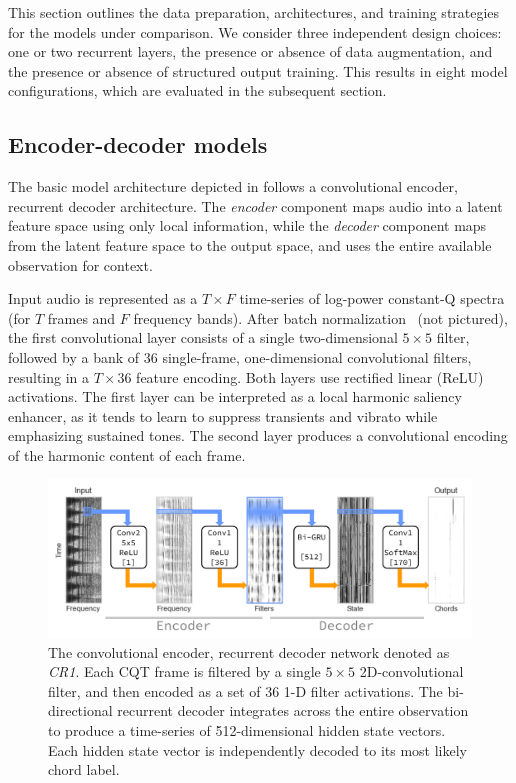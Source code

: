 \documentclass{article}
\begin{document}

This section outlines the data preparation, architectures, and training strategies for the models under comparison.
We consider three independent design choices: one or two recurrent layers, the presence or absence of data augmentation, and the presence or absence of structured output training.
This results in eight model configurations, which are evaluated in the subsequent section.

\subsection{Encoder-decoder models}

The basic model architecture depicted in  follows a convolutional encoder, recurrent decoder architecture.
The \emph{encoder} component maps audio into a latent feature space using only local information, while the \emph{decoder} component maps from the latent feature space to the output space, and uses the entire available observation for context.

Input audio is represented as a $T\times F$ time-series of log-power constant-Q spectra (for $T$ frames and $F$ frequency bands).
After batch normalization~\cite{ioffe2015batch} (not pictured), the first convolutional layer consists of a single two-dimensional $5\times5$ filter, followed by a bank of $36$ single-frame, one-dimensional convolutional filters, resulting in a $T\times 36$ feature encoding.
Both layers use rectified linear (ReLU) activations.
The first layer can be interpreted as a local harmonic saliency enhancer, as it tends to learn to suppress transients and vibrato while emphasizing sustained tones.
The second layer produces a convolutional encoding of the harmonic content of each frame.

\begin{figure}
    \centering
    \includegraphics[width=\columnwidth]{crnn1}
    \caption{The convolutional encoder, recurrent decoder network denoted as \emph{CR1}.
            Each CQT frame is filtered by a single $5\times 5$ 2D-convolutional filter, and then encoded as a set of 36 1-D filter activations.
            The bi-directional recurrent decoder integrates across the entire observation to produce a time-series of 512-dimensional hidden state vectors. 
            Each hidden state vector is independently decoded to its most likely chord label.\label{fig:crnn1}}
\end{figure}
\end{document}
